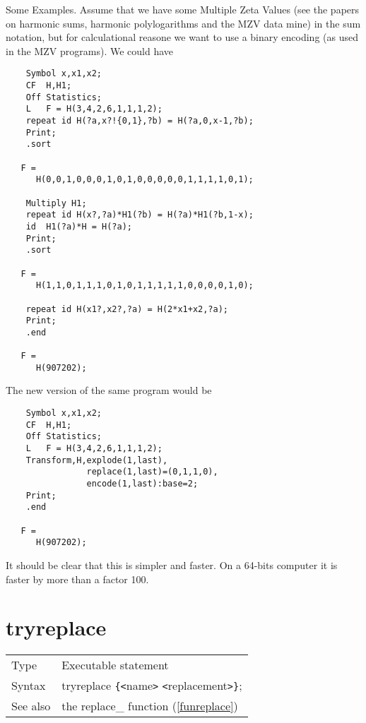 Some Examples. Assume that we have some Multiple Zeta Values (see the papers on harmonic sums, harmonic polylogarithms and the MZV 
data mine) in the sum notation, but for calculational 
reasone we want to use a binary encoding (as used in the MZV programs). We 
could have

\begin{verbatim}
    Symbol x,x1,x2;
    CF  H,H1;
    Off Statistics;
    L   F = H(3,4,2,6,1,1,1,2);
    repeat id H(?a,x?!{0,1},?b) = H(?a,0,x-1,?b);
    Print;
    .sort

   F =
      H(0,0,1,0,0,0,1,0,1,0,0,0,0,0,1,1,1,1,0,1);

    Multiply H1;
    repeat id H(x?,?a)*H1(?b) = H(?a)*H1(?b,1-x);
    id  H1(?a)*H = H(?a);
    Print;
    .sort

   F =
      H(1,1,0,1,1,1,0,1,0,1,1,1,1,1,0,0,0,0,1,0);

    repeat id H(x1?,x2?,?a) = H(2*x1+x2,?a);
    Print;
    .end

   F =
      H(907202);
\end{verbatim}
The new version of the same program would be
\begin{verbatim}
    Symbol x,x1,x2;
    CF  H,H1;
    Off Statistics;
    L   F = H(3,4,2,6,1,1,1,2);
    Transform,H,explode(1,last),
                replace(1,last)=(0,1,1,0),
                encode(1,last):base=2;
    Print;
    .end

   F =
      H(907202);
\end{verbatim}
It should be clear that this is simpler and faster. On a 64-bits computer 
it is faster by more than a factor 100.

\vspace{10mm}


\section{tryreplace}
\label{substatryreplace}

\noindent \begin{tabular}{ll}
Type & Executable statement\\
Syntax & tryreplace \verb:{:{\tt<}name{\tt>} {\tt<}replacement{\tt>}\verb:}:;
\\ See also & the replace\_ function (\ref{funreplace})
\end{tabular} \vspace{4mm}

